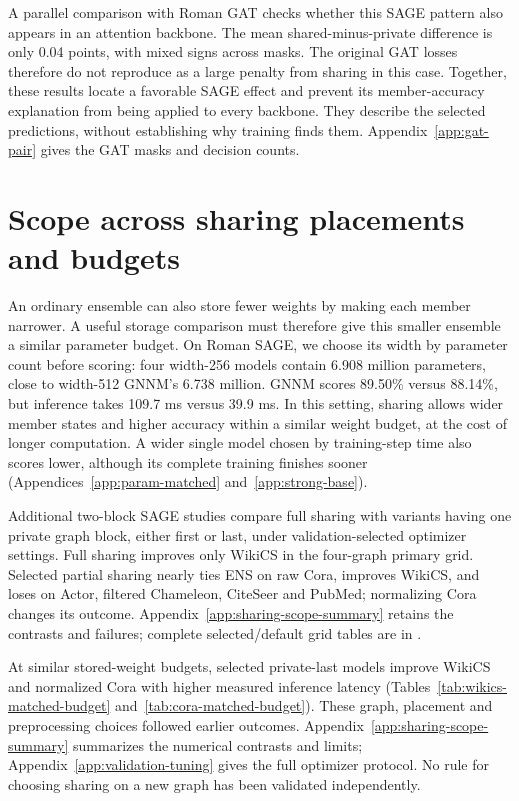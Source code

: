 \documentclass{article}
\begin{document}
A parallel comparison with Roman GAT checks whether this SAGE pattern also appears in an attention backbone. The mean shared-minus-private difference is only 0.04 points, with mixed signs across masks. The original GAT losses therefore do not reproduce as a large penalty from sharing in this case. Together, these results locate a favorable SAGE effect and prevent its member-accuracy explanation from being applied to every backbone. They describe the selected predictions, without establishing why training finds them. Appendix~\ref{app:gat-pair} gives the GAT masks and decision counts.




\section{Scope across sharing placements and budgets}\label{sec:additional}
An ordinary ensemble can also store fewer weights by making each member narrower. A useful storage comparison must therefore give this smaller ensemble a similar parameter budget. On Roman SAGE, we choose its width by parameter count before scoring: four width-256 models contain 6.908 million parameters, close to width-512 GNNM's 6.738 million. GNNM scores 89.50\% versus 88.14\%, but inference takes 109.7 ms versus 39.9 ms. In this setting, sharing allows wider member states and higher accuracy within a similar weight budget, at the cost of longer computation. A wider single model chosen by training-step time also scores lower, although its complete training finishes sooner (Appendices~\ref{app:param-matched} and~\ref{app:strong-base}).

Additional two-block SAGE studies compare full sharing with variants having one private graph block, either first or last, under validation-selected optimizer settings. Full sharing improves only WikiCS in the four-graph primary grid. Selected partial sharing nearly ties ENS on raw Cora, improves WikiCS, and loses on Actor, filtered Chameleon, CiteSeer and PubMed; normalizing Cora changes its outcome. Appendix~\ref{app:sharing-scope-summary} retains the contrasts and failures; complete selected/default grid tables are in .

At similar stored-weight budgets, selected private-last models improve WikiCS and normalized Cora with higher measured inference latency (Tables~\ref{tab:wikics-matched-budget} and~\ref{tab:cora-matched-budget}). These graph, placement and preprocessing choices followed earlier outcomes. Appendix~\ref{app:sharing-scope-summary} summarizes the numerical contrasts and limits; Appendix~\ref{app:validation-tuning} gives the full optimizer protocol. No rule for choosing sharing on a new graph has been validated independently.
\end{document}

